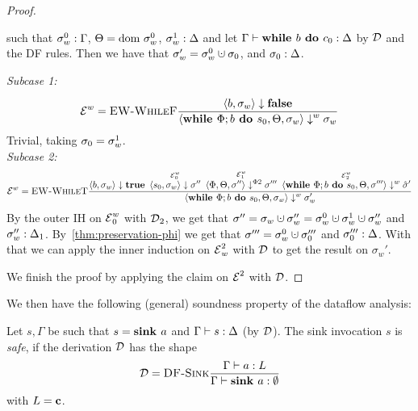 \begin{proof}
\begin{claim}
        such that ${\sigma_w^0}:{\Gamma}$, $\Theta = \text{dom }{\sigma}^0_w$, ${\sigma_w^1}:{\Delta}$
        and let $\Gamma \vdash {\textbf{while }{b} \textbf{ do } {c_0}}: \Delta$ by $\operatorname{\mathcal{D}}$ and the DF rules.
        Then we have that $\store_w' = \store_w^0 \dunion \store_0$,
        and ${\sigma_0}:{\Delta}$.
    \end{claim}
    \begin{claimproof}
        \emph{Subcase 1:}
        \begin{align*}
            \operatorname{\mathcal{E}}^w = \textsc{EW-WhileF}\frac{\displaystyle 
            \overset{}{\langle b, \sigma_w \rangle \downarrow \textbf{false}}}{\displaystyle \langle \textbf{while }\Phi;{b} \textbf{ do } {s_0}, \Theta, \sigma_w \rangle \downarrow^w \sigma_w}
        \end{align*}
        Trivial, taking $\sigma_0 = \sigma_w^1$.\\
        \emph{Subcase 2:}
        \begin{align*}
            \operatorname{\mathcal{E}}^w = \textsc{EW-WhileT}\frac{\displaystyle \overset{}{\langle b, \sigma_w \rangle \downarrow \textbf{true}} \enskip
            \overset{\operatorname{\mathcal{E}}^w_0}{\langle s_0, \sigma_w \rangle \downarrow \sigma''} \enskip
            \overset{\operatorname{\mathcal{E}}^w_1}{\langle \Phi, \Theta, \sigma'' \rangle \downarrow^{\Phi2} \sigma'''} \enskip
            \overset{\operatorname{\mathcal{E}}^w_2}{\langle \textbf{while }\Phi;{b} \textbf{ do } {s_0}, \Theta, \sigma''' \rangle \downarrow^w \hat{\sigma}'}}{\displaystyle \langle \textbf{while }\Phi;{b} \textbf{ do } {s_0}, \Theta, \sigma_w \rangle \downarrow^w \sigma_w'}
        \end{align*}
        By the outer IH on $\operatorname{\mathcal{E}}^w_0$ with $\operatorname{\mathcal{D}}_2$, we get that
        $\sigma'' = \sigma_w \dunion \sigma_w'' = \sigma_w^0 \dunion \sigma_w^1 \dunion \sigma_w''$
        and ${\sigma_w''}:{\Delta_1}$.
        By~\autoref{thm:preservation-phi} we get that $\store''' = \store_w^0 \dunion \store_0'''$ and
        ${\sigma_0'''}:{\Delta}$.
        With that we can apply the inner induction on $\operatorname{\mathcal{E}}^2_w$ with $\operatorname{\mathcal{D}}$ to get the result on $\sigma_w'$.
    \end{claimproof}
    We finish the proof by applying the claim on $\operatorname{\mathcal{E}}^2$ with $\operatorname{\mathcal{D}}$.
\end{proof}


We then have the following (general) soundness property of the dataflow analysis:
\begin{definition}
    Let $s, \Gamma$ be such that $s = \textbf{sink }{a}$ and $\Gamma \vdash {s}: \Delta$ (by $\operatorname{\mathcal{D}}$).
    The sink invocation $s$ is \emph{safe}, if the derivation $\operatorname{\mathcal{D}}$ has the shape
    \begin{align*}
        \operatorname{\mathcal{D}} = \textsc{DF-Sink}\frac{\displaystyle \Gamma \vdash {a}: L}{\displaystyle \Gamma \vdash {\textbf{sink }{a}}: \emptyset}
    \end{align*}
    with $L = \textbf{c}$.
\end{definition}

